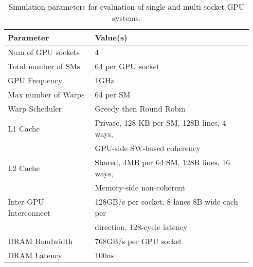 \begin{table}[tp]
\begin{small}
\centering
\begin{tabular}{ll}
\toprule
\textbf{Parameter} & \textbf{Value(s)} \\
\toprule
Num of GPU sockets & 4 \\
\midrule
Total number of SMs & 64 per GPU socket \\
\midrule
GPU Frequency & 1GHz \\
\midrule
Max number of Warps & 64 per SM \\
\midrule
Warp Scheduler & Greedy then Round Robin \\
\midrule
L1 Cache & Private, 128 KB per SM, 128B lines, 4 ways, \\ & GPU-side SW-based 
coherency \\
\midrule
L2 Cache & Shared, 4MB per 64 SM, 128B lines, 16 ways, \\ & Memory-side 
non-coherent\\
\midrule
Inter-GPU Interconnect & 128GB/s per socket, 8 lanes 8B wide each per \\ & 
direction, 128-cycle latency \\
\midrule
DRAM Bandwidth & 768GB/s per GPU socket\\
\midrule
DRAM Latency & 100ns \\
\toprule
\end{tabular}
\caption{Simulation parameters for evaluation of single and multi-socket GPU 
systems.}
\label{tab:setup}
\end{small}
\end{table}